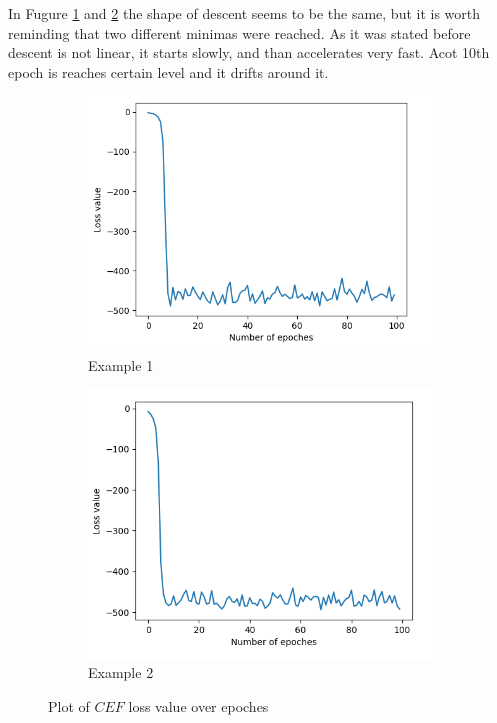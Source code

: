 \documentclass[11pt,a4paper]{IEEEtran}
\begin{document}
In Fugure \ref{fig:loss2:1} and \ref{fig:loss2:2} the shape of descent seems to be the same, but it is worth reminding that two different minimas were reached. As it was stated before descent is not linear, it starts slowly, and than accelerates very fast. Acot 10th epoch is reaches certain level and it drifts around it. 

\begin{figure}[!hbt]	
	\begin{subfigure}[b]{0.45\textwidth}
		\includegraphics[width=\textwidth]{examples/3/loss.png}
		\caption{Example 1}
		\label{fig:loss2:1}
	\end{subfigure}
	\begin{subfigure}[b]{0.45\textwidth}
		\includegraphics[width=\textwidth]{examples/4/loss.png}
		\caption{Example 2}
		\label{fig:loss2:2}
	\end{subfigure}
	\caption{Plot of $CEF$ loss value over epoches}
	\label{fig:loss2}
\end{figure}
\end{document}
